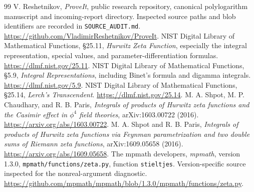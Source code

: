 \documentclass[11pt,a4paper]{article}
\theoremstyle{definition}
\numberwithin{equation}{section}
\begin{document}
\clearpage
\begin{thebibliography}{99}
V. Reshetnikov, \emph{ProveIt}, public research repository, canonical
polylogarithm manuscript and incoming-report directory. Inspected source
paths and blob identifiers are recorded in \texttt{SOURCE\_AUDIT.md}.
\url{https://github.com/VladimirReshetnikov/ProveIt}.
NIST Digital Library of Mathematical Functions, \S25.11, \emph{Hurwitz Zeta
Function}, especially the integral representation, special values,
and parameter-differentiation formulas.
\url{https://dlmf.nist.gov/25.11}.
NIST Digital Library of Mathematical Functions, \S5.9, \emph{Integral
Representations}, including Binet's formula and digamma integrals.
\url{https://dlmf.nist.gov/5.9}.
NIST Digital Library of Mathematical Functions, \S25.14, \emph{Lerch's
Transcendent}.
\url{https://dlmf.nist.gov/25.14}.
M. A. Shpot, M. P. Chaudhary, and R. B. Paris,
\emph{Integrals of products of Hurwitz zeta functions and the Casimir effect
in $\phi^4$ field theories}, arXiv:1603.00722 (2016).
\url{https://arxiv.org/abs/1603.00722}.
M. A. Shpot and R. B. Paris,
\emph{Integrals of products of Hurwitz zeta functions via Feynman
parametrization and two double sums of Riemann zeta functions},
arXiv:1609.05658 (2016).
\url{https://arxiv.org/abs/1609.05658}.
The mpmath developers, \emph{mpmath}, version 1.3.0,
\texttt{mpmath/functions/zeta.py}, function \texttt{stieltjes}.
Version-specific source inspected for the nonreal-argument diagnostic.
\url{https://github.com/mpmath/mpmath/blob/1.3.0/mpmath/functions/zeta.py}.
\end{thebibliography}
\end{document}

